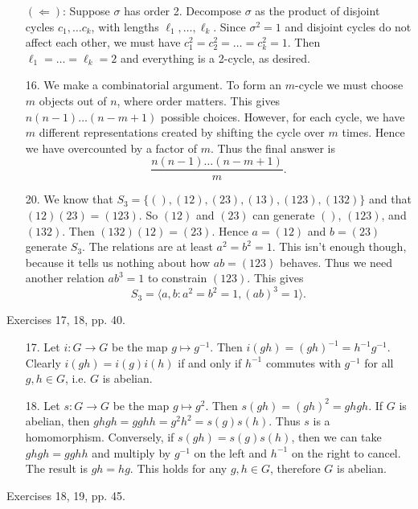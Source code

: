 \documentclass{article}
\begin{document}
\begin{enumerate}
    $(\Leftarrow)$: Suppose $\sigma$ has order 2. Decompose $\sigma$ as the product of disjoint cycles $c_1, \dots c_k$, with lengths $\ell_1, \dots, \ell_k$. Since $\sigma^2 = 1$ and disjoint cycles do not affect each other, we must have $c_1^2 = c_2^2 = \dots = c_k^2 = 1$. Then $\ell_1 = \dots = \ell_k = 2$ and everything is a 2-cycle, as desired.

    \item[16.] We make a combinatorial argument. To form an $m$-cycle we must choose $m$ objects out of $n$, where order matters. This gives $n(n-1) \dots (n - m + 1)$ possible choices. However, for each cycle, we have $m$ different representations created by shifting the cycle over $m$ times. Hence we have overcounted by a factor of $m$. Thus the final answer is 
    \[\frac{n(n-1)\dots(n-m+1)}{m}.\] 

    \item[20.] We know that $S_3 = \{(), (12), (23), (13), (123), (132)\}$ and that $(12)(23) = (123)$. So $(12)$ and $(23)$ can generate $()$, $(123)$, and $(132)$. Then $(132)(12) = (23)$. Hence $a = (12)$ and $b = (23)$ generate $S_3$. The relations are at least $a^2 = b^2 = 1$. 
    This isn't enough though, because it tells us nothing about how $ab = (123)$ behaves. Thus we need another relation $ab^3 = 1$ to constrain $(123)$. This gives \[S_3 = \langle a, b : a^2 = b^2 = 1, (ab)^3 = 1\rangle.\]
\end{enumerate}

Exercises 17, 18, pp. 40.

\begin{enumerate}
    \item[17.] Let $i : G \to G$ be the map $g \mapsto g^{-1}$. Then $i(gh) = (gh)^{-1} = h^{-1}g^{-1}$. Clearly $i(gh) = i(g)i(h)$ if and only if $h^{-1}$ commutes with $g^{-1}$ for all $g, h \in G$, i.e. $G$ is abelian.
    \item[18.] Let $s : G \to G$ be the map $g \mapsto g^2$. Then $s(gh) = (gh)^2 = ghgh$. If $G$ is abelian, then $ghgh = gghh = g^2 h^2 = s(g)s(h)$. Thus $s$ is a homomorphism. Conversely, if $s(gh) = s(g)s(h)$, then we can take $ghgh = gghh$ and multiply by $g^{-1}$ on the left and $h^{-1}$ on the right to cancel. The result is $gh = hg$. This holds for any $g, h \in G$, therefore $G$ is abelian.
\end{enumerate}

Exercises 18, 19, pp. 45.
\end{document}
